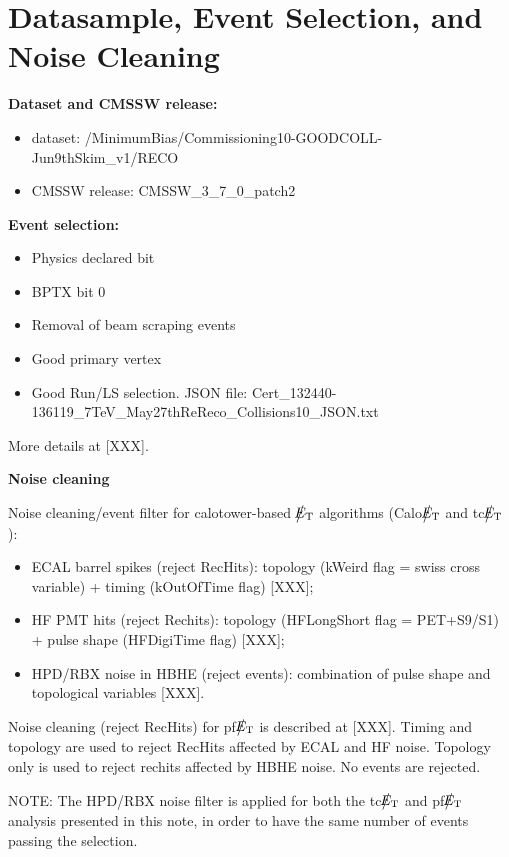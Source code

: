 \section{Datasample, Event Selection, and Noise Cleaning} \label{sec:EventSelection}

{\bf Dataset and CMSSW release:}
\begin{itemize}
\item dataset: /MinimumBias/Commissioning10-GOODCOLL-Jun9thSkim\_v1/RECO
\item CMSSW release: CMSSW\_3\_7\_0\_patch2
\end{itemize}

{\bf Event selection:}
\begin{itemize}
\item Physics declared bit
\item BPTX bit 0
\item Removal of beam scraping events
\item Good primary vertex
\item Good Run/LS selection. JSON file: Cert\_132440-136119\_7TeV\_May27thReReco\_Collisions10\_JSON.txt  
\end{itemize}
More details at [XXX].

{\bf Noise cleaning}

Noise cleaning/event filter for calotower-based $\big\slash\hspace{-1.6ex}{E_\text{T}}$ algorithms (Calo$\big\slash\hspace{-1.6ex}{E_\text{T}}$ and tc$\big\slash\hspace{-1.6ex}{E_\text{T}}$):
\begin{itemize}
\item ECAL barrel spikes (reject RecHits): topology (kWeird flag = swiss cross variable) + timing (kOutOfTime flag) [XXX];
\item HF PMT hits (reject Rechits): topology (HFLongShort flag = PET+S9/S1) + pulse shape (HFDigiTime flag) [XXX];
\item HPD/RBX noise in HBHE (reject events): combination of pulse shape and topological variables [XXX].
\end{itemize}

Noise cleaning (reject RecHits) for pf$\big\slash\hspace{-1.6ex}{E_\text{T}}$ is described at [XXX]. Timing and topology are used to reject RecHits 
affected by ECAL and HF noise. Topology only is used to reject rechits affected by HBHE noise. No events are rejected.

NOTE: The HPD/RBX noise filter is applied for both the tc$\big\slash\hspace{-1.6ex}{E_\text{T}}$ and pf$\big\slash\hspace{-1.6ex}{E_\text{T}}$ analysis presented in this note, 
in order to have the same number of events passing the selection.

